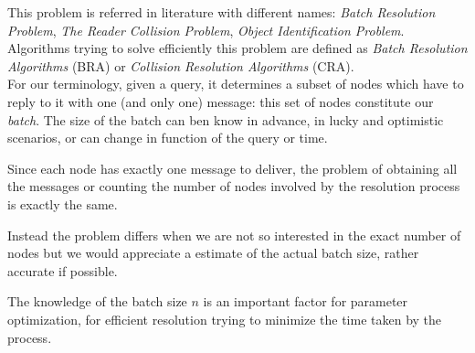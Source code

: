 \documentclass[12pt,a4paper,twocolumns]{report}
\begin{document}
This problem is referred in literature with different names: \emph{Batch Resolution Problem}, \emph{The Reader Collision Problem}, \emph{Object Identification Problem}.\\
Algorithms trying to solve efficiently this problem are defined as \emph{Batch Resolution Algorithms} (BRA) or  \emph{Collision Resolution Algorithms} (CRA).\\ 

For our terminology, given a query, it determines a subset of nodes which have to reply to it with one (and only one) message: this set of nodes constitute our \emph{batch}. The size of the batch can ben know in advance, in lucky and optimistic scenarios, or can change in function of the query or time.

Since each node has exactly one message to deliver, the problem of obtaining all the messages or counting the number of nodes involved by the resolution process is exactly the same.

Instead the problem differs when we are not so interested in the exact number of nodes but we would appreciate a estimate of the actual batch size, rather accurate if possible.

The knowledge of the batch size $n$ is an important factor for parameter optimization, for efficient resolution trying to minimize the time taken by the process.

\begin{comment}
This necessitates the usage of algorithms for resolving batch collisions (conflicts) with unknown conflict multiplicity $n$.

In this paper we present a novel approach to the problem of collision resolution for batch conflicts. We show how the conventional tree algorithms for collision resolution can be used to obtain progressively accurate estimation of the multiplicity. We use the estimation to propose a more efficient binary tree algorithm, termed Estimating Binary Tree (EBT) algorithm. The EBT algorithm is suited for implementation when the conflicting nodes are passive, such as e.g. RFID tags. We extend the approach to design the Interval Estimation Conflict Resolution (IECR) algorithm. For $n \rightarrow \infty $  we prove that the efficiency achieved by IECR for batch arrivals is identical with the efficiency that Gallager’s FCFS algorithm achieves for Poisson packet arrivals. For finite n, the simulation results show that IECR is, to the best of our knowledge, the most efficient batch resolution algorithm reported to date.
\end{comment}
\end{document}
